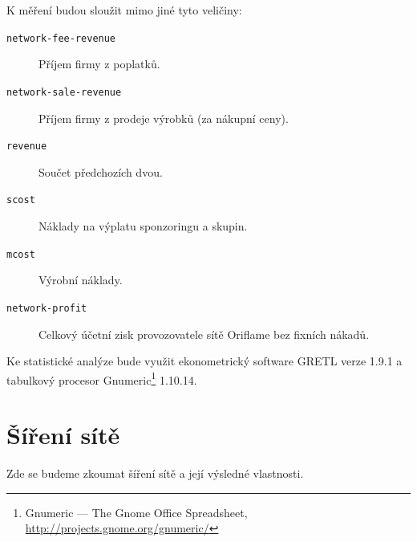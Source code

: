 \documentclass[a4wide,12pt]{report}
\begin{document}
K měření budou sloužit mimo jiné tyto veličiny:
\begin{description}
\item[\texttt{network-fee-revenue}] Příjem firmy z poplatků.
\item[\texttt{network-sale-revenue}] Příjem firmy z prodeje výrobků (za nákupní ceny).
\item[\texttt{revenue}] Součet předchozích dvou.
\item[\texttt{scost}] Náklady na výplatu sponzoringu a skupin.
\item[\texttt{mcost}] Výrobní náklady.
\item[\texttt{network-profit}] Celkový účetní zisk provozovatele sítě Oriflame bez fixních nákadů. 
\end{description}
Ke statistické analýze bude využit ekonometrický software GRETL\cite{gretl} verze 1.9.1 a tabulkový procesor Gnumeric\footnote{Gnumeric --- The Gnome Office Spreadsheet, \url{http://projects.gnome.org/gnumeric/}} 1.10.14.
\section{Šíření sítě}
Zde se budeme zkoumat šíření sítě a její výsledné vlastnosti. 
\end{document}
